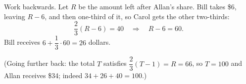 Work backwards. Let $R$ be the amount left after Allan's share. Bill takes \$6, leaving $R-6$, and then one-third of it, so Carol gets the other two-thirds:
\[\dfrac23(R-6)=40\quad\Longrightarrow\quad R-6=60.\]
Bill receives $6+\dfrac13\cdot60=\boxed{26}$ dollars.

(Going further back: the total $T$ satisfies $\dfrac23(T-1)=R=66$, so $T=100$ and Allan receives \$34; indeed $34+26+40=100$.)
